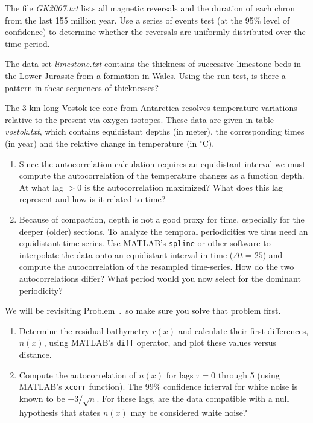 \begin{problem}
The file \emph{GK2007.txt} lists all magnetic reversals and the duration of each chron from the last 155 million year.  
Use a series of events test (at the 95\% level of confidence) to determine whether the 
reversals are uniformly distributed over the time period.
\end{problem}

\begin{problem}
The data set \emph{limestone.txt} contains the thickness of successive limestone beds in the Lower Jurassic
from a formation in Wales.   Using the run test, is there a pattern in these sequences of thicknesses?
\end{problem}

\begin{problem}
\setcounter{Vostok}{\theproblem}
The 3-km long Vostok ice core from Antarctica resolves temperature variations relative to the present via
oxygen isotopes. These data are given in table \emph{vostok.txt}, which contains equidistant depths (in meter), the
corresponding times (in year) and the relative change in temperature (in $^{\circ}$C).
\begin{enumerate}[label=\alph*)]
\item Since the autocorrelation calculation requires an equidistant interval we must compute the autocorrelation
of the temperature changes as a function depth.
At what lag $> 0$ is the autocorrelation maximized?  What does this lag represent and how is it related to
time?
\item Because of compaction, depth is not a good proxy for time, especially for the deeper (older) sections.
To analyze the temporal periodicities we thus need an equidistant time-series. Use MATLAB's \texttt{spline}
or other software to interpolate the data onto an
equidistant interval in time ($\Delta t = 25$) and compute the autocorrelation
of the resampled time-series.  How do the two autocorrelations differ? What period would you now select for the
dominant periodicity?
\end{enumerate}
\end{problem}

\begin{problem}
We will be revisiting Problem~\theConradchap.\theConrad\, so make sure you solve that problem first.
\begin{enumerate}[label=\alph*)]
\item Determine the residual bathymetry $r(x)$ and calculate their first differences, $n(x)$, using
MATLAB's \texttt{diff} operator, and plot these values versus distance.
\item Compute the autocorrelation of $n(x)$ for lags $\tau = 0$ through 5 (using MATLAB's \texttt{xcorr} function).
The 99\% confidence interval for white noise is known to be $\pm 3/\sqrt{n}$.  For these lags, are the data
compatible with a null hypothesis that states $n(x)$ may be considered white noise?
\end{enumerate}
\end{problem}

